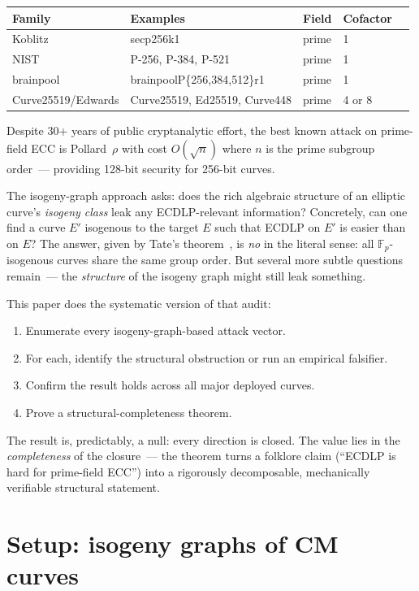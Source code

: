 \documentclass[11pt,a4paper]{article}
\theoremstyle{definition}
\newcommand{\FF}{\mathbb{F}}
\begin{document}
\begin{center}
\begin{tabular}{lllll}
\toprule
Family & Examples & Field & Cofactor \\
\midrule
Koblitz & secp256k1 & prime & 1 \\
NIST & P-256, P-384, P-521 & prime & 1 \\
brainpool & brainpoolP\{256,384,512\}r1 & prime & 1 \\
Curve25519/Edwards & Curve25519, Ed25519, Curve448 & prime & 4 or 8 \\
\bottomrule
\end{tabular}
\end{center}

Despite 30+ years of public cryptanalytic effort, the best known
attack on prime-field ECC is Pollard~$\rho$ with cost $O(\sqrt{n})$
where $n$ is the prime subgroup order~--- providing 128-bit
security for 256-bit curves.

The isogeny-graph approach asks: does the rich algebraic structure
of an elliptic curve's \emph{isogeny class} leak any
ECDLP-relevant information? Concretely, can one find a curve $E'$
isogenous to the target $E$ such that ECDLP on $E'$ is easier than
on $E$? The answer, given by Tate's theorem~\cite{tate1966}, is
\emph{no} in the literal sense: all $\FF_p$-isogenous curves share
the same group order. But several more subtle questions
remain~--- the \emph{structure} of the isogeny graph might still
leak something.

This paper does the systematic version of that audit:

\begin{enumerate}
\item Enumerate every isogeny-graph-based attack vector.
\item For each, identify the structural obstruction or run an
      empirical falsifier.
\item Confirm the result holds across all major deployed curves.
\item Prove a structural-completeness theorem.
\end{enumerate}

The result is, predictably, a null: every direction is closed.
The value lies in the \emph{completeness} of the closure~--- the
theorem turns a folklore claim (``ECDLP is hard for prime-field
ECC'') into a rigorously decomposable, mechanically verifiable
structural statement.

\section{Setup: isogeny graphs of CM curves}
\end{document}
